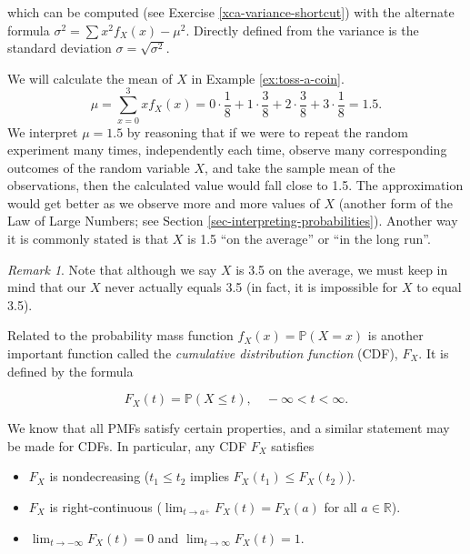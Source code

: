 \documentclass[]{book}
\providecommand{\tightlist}{%
  \setlength{\itemsep}{0pt}\setlength{\parskip}{0pt}}
\numberwithin{equation}{chapter}
\numberwithin{figure}{chapter}
\theoremstyle{plain}
\theoremstyle{definition}
\theoremstyle{remark}
\theoremstyle{definition}
\theoremstyle{definition}
\theoremstyle{remark}
\newtheorem*{remark}{Remark}
\let\BeginKnitrBlock\begin \let\EndKnitrBlock\end
\begin{document}
which can be computed (see Exercise \ref{xca-variance-shortcut}) with
the alternate formula \(\sigma^{2}=\sum x{}^{2}f_{X}(x)-\mu^{2}\).
Directly defined from the variance is the standard deviation
\(\sigma=\sqrt{\sigma^{2}}\).

\bigskip

\BeginKnitrBlock{example}
\protect\hypertarget{ex:disc-pmf-mean}{}{\label{ex:disc-pmf-mean}}We will
calculate the mean of \(X\) in Example \ref{ex:toss-a-coin}.
\[ \mu = \sum_{x = 0}^{3}xf_{X}(x) = 0 \cdot
\frac{1}{8} + 1 \cdot \frac{3}{8} + 2 \cdot
\frac{3}{8}+3\cdot\frac{1}{8} = 1.5. \] We interpret \(\mu = 1.5\) by
reasoning that if we were to repeat the random experiment many times,
independently each time, observe many corresponding outcomes of the
random variable \(X\), and take the sample mean of the observations,
then the calculated value would fall close to 1.5. The approximation
would get better as we observe more and more values of \(X\) (another
form of the Law of Large Numbers; see Section
\ref{sec-interpreting-probabilities}). Another way it is commonly stated
is that \(X\) is 1.5 ``on the average'' or ``in the long run''.
\EndKnitrBlock{example}

\bigskip

\begin{remark}
Note that although we say \(X\) is 3.5 on the average, we must keep in
mind that our \(X\) never actually equals 3.5 (in fact, it is impossible
for \(X\) to equal 3.5).
\end{remark}

Related to the probability mass function \(f_{X}(x)=\mathbb{P}(X=x)\) is
another important function called the \emph{cumulative distribution
function} (CDF), \(F_{X}\). It is defined by the formula

\begin{equation}
F_{X}(t)=\mathbb{P}(X\leq t),\quad -\infty < t < \infty.
\end{equation}

We know that all PMFs satisfy certain properties, and a similar
statement may be made for CDFs. In particular, any CDF \(F_{X}\)
satisfies

\begin{itemize}
\tightlist
\item
  \(F_{X}\) is nondecreasing (\(t_{1}\leq t_{2}\) implies
  \(F_{X}(t_{1})\leq F_{X}(t_{2})\)).
\item
  \(F_{X}\) is right-continuous (\(\lim_{t\to  a^{+}}F_{X}(t)=F_{X}(a)\)
  for all \(a\in\mathbb{R}\)).
\item
  \(\lim_{t\to-\infty}F_{X}(t)=0\) and \(\lim_{t\to\infty}F_{X}(t)=1\).
\end{itemize}
\end{document}
